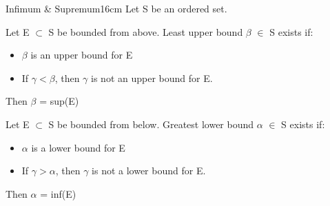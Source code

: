 	\vspace{0.5cm}



	\begin{definition}{Infimum \& Supremum}{16cm}
		Let S be an ordered set.

		Let E $ \subset $ S be bounded from above.
		{\color{lblue} Least upper bound} $\beta$ $\in$ S exists if:
		
		\begin{itemize}[leftmargin=1cm, itemsep=0.1cm]
			\item $\beta$ is an upper bound for E
		
			\item If $\gamma < \beta$, then $ \gamma $ is not an upper bound for E.
		\end{itemize}

		Then $\beta$ = sup(E)

		\vspace{0.3cm}

		Let E $\subset$ S be bounded from below.
		{\color{lblue} Greatest lower bound} $\alpha$ $\in$ S exists if:
		
		\begin{itemize}[leftmargin=1cm , itemsep=0.1cm]
			\item $\alpha$ is a lower bound for E

			\item If $\gamma > \alpha$, then $\gamma$ is not a lower bound for E.
		\end{itemize}

		Then $\alpha$ = inf(E)
	\end{definition}
	
	\vspace{0.5cm}



